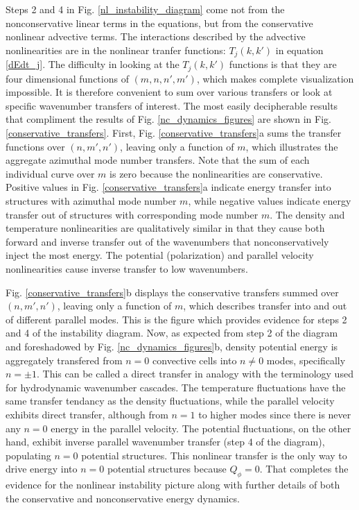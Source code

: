 \documentclass[showpacs,preprintnumbers,amsmath,amssymb,superscriptaddress]{revtex4}
\begin{document}
Steps 2 and 4 in Fig. \ref{nl_instability_diagram} come not from the nonconservative linear terms in the equations, but from the conservative nonlinear advective terms.
The interactions described by the advective nonlinearities are in the nonlinear tranfer functions: $T_{j}(k,k')$ in equation \ref{dEdt_j}.
The difficulty in looking at the $T_{j}(k,k')$ functions is that they are four dimensional functions of $(m,n,n',m')$, 
which makes complete visualization impossible. It is therefore convenient to sum over various transfers or look at specific wavenumber transfers of interest. The most easily decipherable
results that compliment the results of Fig. \ref{nc_dynamics_figures} are shown in Fig. \ref{conservative_transfers}. First, Fig. \ref{conservative_transfers}a sums the transfer functions over
$(n,m',n')$, leaving only a function of $m$, which illustrates the aggregate azimuthal mode
number transfers. Note that the sum of each individual curve over $m$ is zero because the nonlinearities are conservative. Positive values in Fig. \ref{conservative_transfers}a
indicate energy transfer into structures with azimuthal mode number $m$, while negative values indicate energy transfer out of structures with corresponding mode number $m$. 
The density and temperature nonlinearities
are qualitatively similar in that they cause both forward and inverse transfer out of the wavenumbers that nonconservatively inject the most energy. The potential (polarization) and parallel velocity 
nonlinearities cause inverse transfer to low wavenumbers. 

Fig. \ref{conservative_transfers}b displays the conservative transfers summed over $(n,m',n')$, leaving only a function of $m$, which describes transfer into and out
of different parallel modes. This is the figure which provides evidence for steps 2 and 4 of the instability diagram.
Now, as expected from step 2 of the diagram and foreshadowed by Fig. \ref{nc_dynamics_figures}b, 
density potential energy is aggregately transfered from $n=0$ convective cells into $n \ne 0$ modes, specifically $n = \pm 1$. This can be called a direct
transfer in analogy with the terminology used for hydrodynamic wavenumber cascades. The temperature fluctuations have the same transfer tendancy 
as the density fluctuations, while the parallel velocity exhibits direct transfer, although from $n=1$ to higher modes since there is never any $n=0$ energy in the parallel velocity.
The potential fluctuations, on the other hand, exhibit inverse parallel wavenumber transfer (step 4 of the diagram),
populating $n=0$ potential structures. This nonlinear transfer is the only way to drive energy into
$n=0$ potential structures because $Q_\phi=0$. That completes the evidence for the nonlinear instability picture along with further details of both the conservative and nonconservative energy dynamics.
\end{document}
